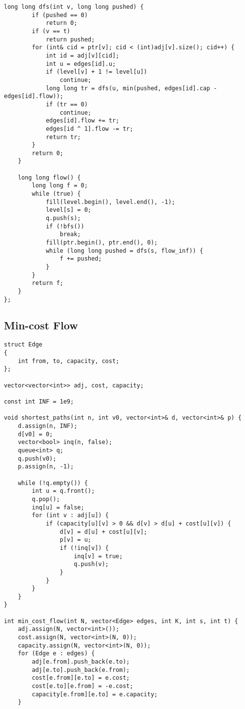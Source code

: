 \documentclass[10pt]{article}
\begin{document}
\begin{multicols*}{2}
\begin{lstlisting}[style=compactcpp]
    long long dfs(int v, long long pushed) {
        if (pushed == 0)
            return 0;
        if (v == t)
            return pushed;
        for (int& cid = ptr[v]; cid < (int)adj[v].size(); cid++) {
            int id = adj[v][cid];
            int u = edges[id].u;
            if (level[v] + 1 != level[u])
                continue;
            long long tr = dfs(u, min(pushed, edges[id].cap - edges[id].flow));
            if (tr == 0)
                continue;
            edges[id].flow += tr;
            edges[id ^ 1].flow -= tr;
            return tr;
        }
        return 0;
    }

    long long flow() {
        long long f = 0;
        while (true) {
            fill(level.begin(), level.end(), -1);
            level[s] = 0;
            q.push(s);
            if (!bfs())
                break;
            fill(ptr.begin(), ptr.end(), 0);
            while (long long pushed = dfs(s, flow_inf)) {
                f += pushed;
            }
        }
        return f;
    }
};
\end{lstlisting}

\subsection{Min-cost Flow}

\begin{lstlisting}[style=compactcpp]
struct Edge
{
    int from, to, capacity, cost;
};

vector<vector<int>> adj, cost, capacity;

const int INF = 1e9;

void shortest_paths(int n, int v0, vector<int>& d, vector<int>& p) {
    d.assign(n, INF);
    d[v0] = 0;
    vector<bool> inq(n, false);
    queue<int> q;
    q.push(v0);
    p.assign(n, -1);

    while (!q.empty()) {
        int u = q.front();
        q.pop();
        inq[u] = false;
        for (int v : adj[u]) {
            if (capacity[u][v] > 0 && d[v] > d[u] + cost[u][v]) {
                d[v] = d[u] + cost[u][v];
                p[v] = u;
                if (!inq[v]) {
                    inq[v] = true;
                    q.push(v);
                }
            }
        }
    }
}

int min_cost_flow(int N, vector<Edge> edges, int K, int s, int t) {
    adj.assign(N, vector<int>());
    cost.assign(N, vector<int>(N, 0));
    capacity.assign(N, vector<int>(N, 0));
    for (Edge e : edges) {
        adj[e.from].push_back(e.to);
        adj[e.to].push_back(e.from);
        cost[e.from][e.to] = e.cost;
        cost[e.to][e.from] = -e.cost;
        capacity[e.from][e.to] = e.capacity;
    }


\end{lstlisting}
\end{multicols*}
\end{document}
